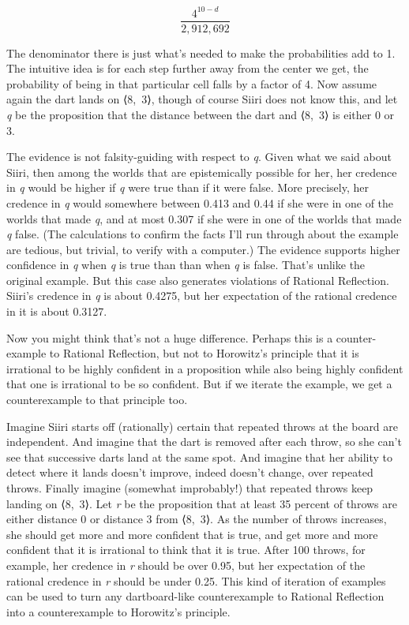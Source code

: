 \documentclass[
  10pt,
  letterpaper,
  twoside]{scrbook}
\begin{document}
\[
\frac{4^{10-d}}{2,912,692}
\]

The denominator there is just what's needed to make the probabilities
add to 1. The intuitive idea is for each step further away from the
center we get, the probability of being in that particular cell falls by
a factor of 4. Now assume again the dart lands on ⟨8,~3⟩, though of
course {Siiri} does not know this, and let \emph{q} be the proposition
that the distance between the dart and ⟨8,~3⟩ is either 0 or 3.

The evidence is not falsity-guiding with respect to \emph{q}. Given what
we said about {Siiri}, then among the worlds that are epistemically
possible for her, her credence in \emph{q} would be higher if \emph{q}
were true than if it were false. More precisely, her credence in
\emph{q} would somewhere between 0.413 and 0.44 if she were in one of
the worlds that made \emph{q}, and at most 0.307 if she were in one of
the worlds that made \emph{q} false. (The calculations to confirm the
facts I'll run through about the example are tedious, but trivial, to
verify with a computer.) The evidence supports higher confidence in
\emph{q} when \emph{q} is true than than when \emph{q} is false. That's
unlike the original example. But this case also generates violations of
Rational Reflection. {Siiri}'s credence in \emph{q} is about 0.4275, but
her expectation of the rational credence in it is about 0.3127.

Now you might think that's not a huge difference. Perhaps this is a
counter-example to Rational Reflection, but not to Horowitz's principle
that it is irrational to be highly confident in a proposition while also
being highly confident that one is irrational to be so confident. But if
we iterate the example, we get a counterexample to that principle too.

Imagine {Siiri} starts off (rationally) certain that repeated throws at
the board are independent. And imagine that the dart is removed after
each throw, so she can't see that successive darts land at the same
spot. And imagine that her ability to detect where it lands doesn't
improve, indeed doesn't change, over repeated throws. Finally imagine
(somewhat improbably!) that repeated throws keep landing on ⟨8,~3⟩. Let
\emph{r} be the proposition that at least 35 percent of throws are
either distance 0 or distance 3 from ⟨8,~3⟩. As the number of throws
increases, she should get more and more confident that is true, and get
more and more confident that it is irrational to think that it is true.
After 100 throws, for example, her credence in \emph{r} should be over
0.95, but her expectation of the rational credence in \emph{r} should be
under 0.25. This kind of iteration of examples can be used to turn any
dartboard-like counterexample to Rational Reflection into a
counterexample to Horowitz's principle.
\end{document}
